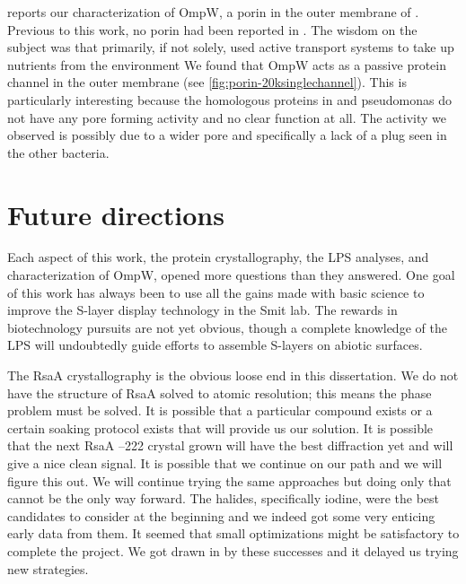  reports our characterization of OmpW, a porin in the outer membrane of \caulobacter{}. Previous to this work, no porin had been reported in \caulobacter{}. The wisdom on the subject was that \caulobacter{} primarily, if not solely, used active transport systems to take up nutrients from the environment We found that OmpW acts as a passive protein channel in the outer membrane (see \cref{fig:porin-20ksinglechannel}). This is particularly interesting because the homologous proteins in \ecoli{} and \acl{pseudomonas} do not have any pore forming activity and no clear function at all.  The activity we observed is possibly due to a wider pore and specifically a lack of a plug seen in the other bacteria.  

\section{Future directions}\label{sec:future-directions}

Each aspect of this work, the protein crystallography, the \ac{LPS} analyses, and characterization of OmpW, opened more questions than they answered. One goal of this work has always been to use all the gains made with basic science to improve the \caulobacter{} \ac{S-layer} display technology in the Smit lab. The rewards in biotechnology pursuits are not yet obvious, though a complete knowledge of the \ac{LPS} will undoubtedly guide efforts to assemble \acp{S-layer} on abiotic surfaces.

The RsaA crystallography is the obvious loose end in this dissertation. We do not have the structure of RsaA solved to atomic resolution; this means the phase problem must be solved. It is possible that a particular compound exists or a certain soaking protocol exists that will provide us our solution. It is possible that the next RsaA --222 crystal grown will have the best diffraction yet and will give a nice clean signal. It is possible that we continue on our path and we will figure this out. We will continue trying the same approaches but doing only that cannot be the only way forward. The halides, specifically iodine, were the best candidates to consider at the beginning and we indeed got some very enticing early data from them. It seemed that small optimizations might be satisfactory to complete the project. We got drawn in by these successes and it delayed us trying new strategies.

